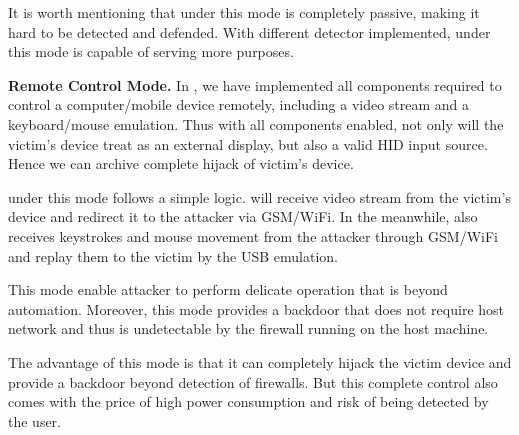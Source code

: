 It is worth mentioning that \tool under this mode is completely passive, making
it hard to be detected and defended. With different detector implemented, \tool
under this mode is capable of serving more purposes.

\textbf{Remote Control Mode.} In \tool, we have implemented all components
required to control a computer/mobile device remotely, including a video stream
and a keyboard/mouse emulation. Thus with all components enabled, not only will
the victim's device treat \tool as an external display, but also a valid HID
input source. Hence we can archive complete hijack of victim's device.

\tool under this mode follows a simple logic. \tool will receive video stream
from the victim's device and redirect it to the attacker via GSM/WiFi. In the
meanwhile, \tool also receives keystrokes and mouse movement from the attacker
through GSM/WiFi and replay them to the victim by the USB emulation.

This mode enable attacker to perform delicate operation that is beyond
automation. Moreover, this mode provides a backdoor that does not require host
network and thus is undetectable by the firewall running on the host machine.

The advantage of this mode is that it can completely hijack the victim device
and provide a backdoor beyond detection of firewalls. But this complete control
also comes with the price of high power consumption and risk of being detected
by the user.

